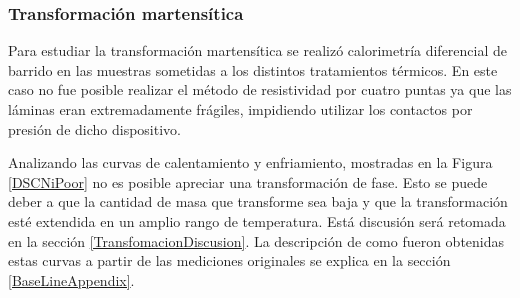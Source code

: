 \documentclass[12pt]{article}
\theoremstyle{definition}
\theoremstyle{remark}
\begin{document}
{\subsubsection{Transformación martensítica}

Para estudiar la transformación martensítica se realizó calorimetría diferencial de barrido en las muestras sometidas a los distintos tratamientos térmicos. En este caso no fue posible realizar el método de resistividad por cuatro puntas ya que las láminas eran extremadamente frágiles, impidiendo utilizar los contactos por presión de dicho dispositivo.

Analizando las curvas de calentamiento y enfriamiento, mostradas en la Figura \ref{DSCNiPoor} no es posible apreciar una transformación de fase. Esto se puede deber a que la cantidad de masa que transforme sea baja y que la transformación esté extendida en un amplio rango de temperatura. Está discusión será retomada en la sección \ref{TransfomacionDiscusion}. La descripción de como fueron obtenidas estas curvas a partir de las mediciones originales se explica en la sección \ref{BaseLineAppendix}.

}
\end{document}
